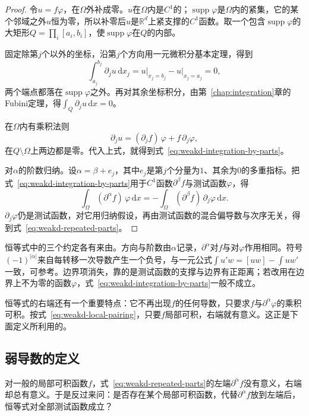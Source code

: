 \begin{proof}
令$u=f\varphi$，在$\Omega$外补成零。$u$在$\Omega$内是$C^1$的；$\operatorname{supp}\varphi$是$\Omega$内的紧集，它的某个邻域之外$u$恒为零，所以补零后$u$是$\mathbb R^d$上紧支撑的$C^1$函数。取一个包含$\operatorname{supp}\varphi$的大矩形$Q=\prod_i[a_i,b_i]$，使$\operatorname{supp}\varphi$在$Q$的内部。

固定除第$j$个以外的坐标，沿第$j$个方向用一元微积分基本定理，得到
\[
\int_{a_j}^{b_j}\partial_ju\,\mathrm dx_j=u\big|_{x_j=b_j}-u\big|_{x_j=a_j}=0 ,
\]
两个端点都落在$\operatorname{supp}\varphi$之外。再对其余坐标积分，由第~\ref{chap:integration}章的Fubini定理，得$\int_Q\partial_ju\,\mathrm dx=0$。

在$\Omega$内有乘积法则
\[
\partial_ju=(\partial_jf)\,\varphi+f\,\partial_j\varphi ,
\]
在$Q\setminus\Omega$上两边都是零。代入上式，就得到式~\eqref{eq:weakd-integration-by-parts}。

对$\alpha$的阶数归纳。设$\alpha=\beta+e_j$，其中$e_j$是第$j$个分量为$1$、其余为$0$的多重指标。把式~\eqref{eq:weakd-integration-by-parts}用于$C^1$函数$\partial^\beta f$与测试函数$\varphi$，得
\[
\int_\Omega(\partial^\alpha f)\,\varphi\,\mathrm dx=-\int_\Omega(\partial^\beta f)\,\partial_j\varphi\,\mathrm dx .
\]
$\partial_j\varphi$仍是测试函数，对它用归纳假设，再由测试函数的混合偏导数与次序无关，得到式~\eqref{eq:weakd-repeated-parts}。
\end{proof}

恒等式中的三个约定各有来由。方向与阶数由$\alpha$记录，$\partial^\alpha$对$f$与对$\varphi$作用相同。符号$(-1)^{\lvert\alpha\rvert}$来自每转移一次导数产生一个负号，与一元公式$\int u'w=[uw]-\int uw'$一致，可参考。边界项消失，靠的是测试函数的支撑与边界有正距离；若改用在边界上不为零的函数$\varphi$，式~\eqref{eq:weakd-integration-by-parts}一般不成立。

恒等式的右端还有一个重要特点：它不再出现$f$的任何导数，只要求$f$与$\partial^\alpha\varphi$的乘积可积。按式~\eqref{eq:weakd-local-pairing}，只要$f$局部可积，右端就有意义。这正是下面定义所利用的。

\subsection{弱导数的定义}
\label{sec:weakd-definition}

对一般的局部可积函数$f$，式~\eqref{eq:weakd-repeated-parts}的左端$\partial^\alpha f$没有意义，右端却总有意义。于是反过来问：是否存在某个局部可积函数，代替$\partial^\alpha f$放到左端后，恒等式对全部测试函数成立？

